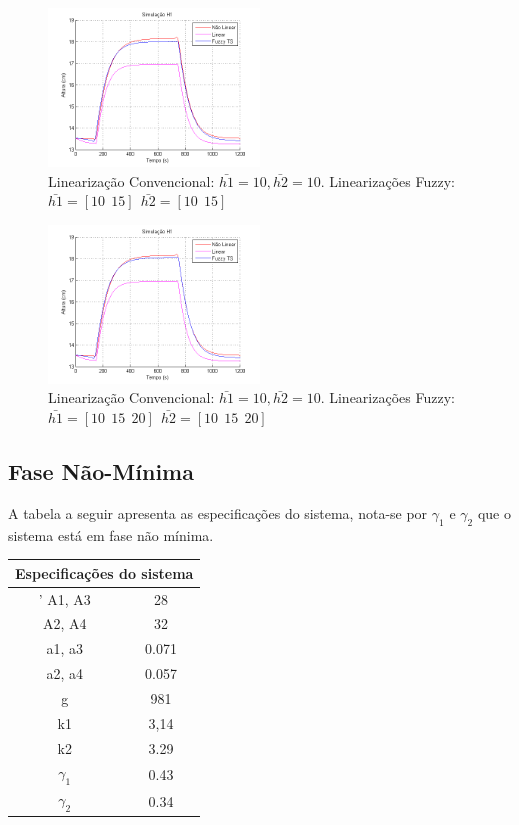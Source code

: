 \begin{figure}[H]
	\includegraphics[width=0.5\textwidth]{img/FM_h1_10_15.png}
	\caption{\small Linearização Convencional: $ \bar{h1}=10, \bar{h2}=10$. Linearizações Fuzzy: $\bar{h1}=[10 \ \ 15] \ \ \bar{h2}=[10 \ \ 15]$ }
	\label{figH1FM_2}
\end{figure}

\begin{figure}[]
	\includegraphics[width=0.5\textwidth]{img/FM_h1_10_15_20.png}
	\caption{\small Linearização Convencional: $ \bar{h1}=10, \bar{h2}=10$. Linearizações Fuzzy: $\bar{h1}=[10 \ \ 15 \ \ 20] \ \ \bar{h2}=[10 \ \ 15 \ \ 20]$ }
	\label{figH1FM_3}
\end{figure}

\subsection{Fase Não-Mínima}
A tabela a seguir apresenta as especificações do sistema, nota-se por $\gamma_1$ e $\gamma_2$ que o sistema está em fase não mínima.
\begin{center}
	\begin{tabular}{|c|c|}
		\hline
		\multicolumn{2}{|c|}{Especificações do sistema} \\
		\hline'
		A1, A3 & 28 \\ \hline
		A2, A4 & 32 \\ \hline
		a1, a3 & 0.071 \\ \hline
		a2, a4 & 0.057 \\ \hline
		g & 981 \\ \hline
		k1 & 3,14 \\ \hline
		k2 & 3.29 \\ \hline
		$\gamma_1$ & 0.43 \\ \hline
		$\gamma_2$ & 0.34 \\ \hline
		\hline
	\end{tabular}
\end{center}


